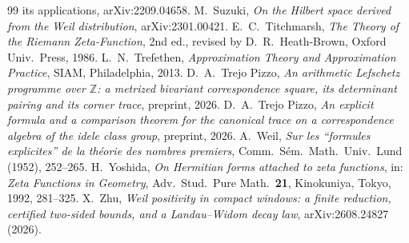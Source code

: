 \documentclass[11pt]{amsart}
\theoremstyle{definition}
\theoremstyle{remark}
\newcommand{\Z}{\mathbb Z}
\begin{document}
\begin{thebibliography}{99}
{its applications}, arXiv:2209.04658.
 M.~Suzuki, \emph{On the Hilbert space derived from the Weil
distribution}, arXiv:2301.00421.
 E.~C.~Titchmarsh, \emph{The Theory of the Riemann
Zeta-Function}, 2nd ed., revised by D.~R.~Heath-Brown, Oxford Univ.~Press, 1986.
 L.~N.~Trefethen, \emph{Approximation Theory and Approximation Practice},
SIAM, Philadelphia, 2013.
 D.~A.~Trejo Pizzo, \emph{An arithmetic Lefschetz programme over $\Z$: a metrized
bivariant correspondence square, its determinant pairing and its corner trace}, preprint, 2026.
 D.~A.~Trejo Pizzo, \emph{An explicit formula and a comparison theorem for the canonical trace on a correspondence
algebra of the idele class group}, preprint, 2026.
 A.~Weil, \emph{Sur les ``formules explicites'' de la th\'eorie des nombres
premiers}, Comm.~S\'em.~Math.~Univ.~Lund (1952), 252--265.
 H.~Yoshida, \emph{On Hermitian forms attached to zeta functions}, in:
\emph{Zeta Functions in Geometry}, Adv.~Stud.~Pure Math.~\textbf{21}, Kinokuniya, Tokyo, 1992, 281--325.
 X.~Zhu, \emph{Weil positivity in compact windows: a finite reduction, certified
two-sided bounds, and a Landau--Widom decay law}, arXiv:2608.24827 (2026).
\end{thebibliography}
\end{document}
